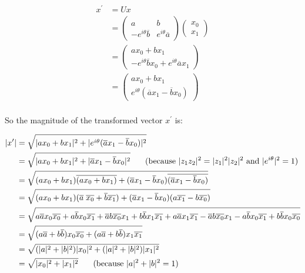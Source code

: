 \documentclass{article}
\begin{document}
\begin{align*}
x^{\prime}
&= U x\\
&= \begin{pmatrix}
   a & b\\
   -e^{i\theta}\overline{b} & e^{i\theta}\overline{a}
\end{pmatrix}
\begin{pmatrix} x_0\\x_1\end{pmatrix}\\
&= \begin{pmatrix}
   ax_0 + bx_1\\
   -e^{i\theta}\overline{b} x_0 +  e^{i\theta}\overline{a} x_1
\end{pmatrix}\\
&= \begin{pmatrix}
   ax_0 + bx_1\\
   e^{i\theta}(
   \overline{a} x_1 - \overline{b} x_0)
\end{pmatrix}\\
\end{align*}

So the magnitude of the transformed vector $x^{\prime}$ is:

\begin{align*}
|x^{\prime}| &=
\sqrt{|ax_0+bx_1|^2 + |e^{i\theta}(\overline{a}x_1-\overline{b}x_0)|^2}\\
&=
\sqrt{|ax_0+bx_1|^2 + |\overline{a}x_1-\overline{b}x_0|^2}
\hspace{0.25in}(\text{because }|z_1 z_2|^2 = |z_1|^2 |z_2|^2 \text{ and } |e^{i\theta}|^2 = 1) \\
&=
\sqrt{(ax_0+bx_1)\overline{(ax_0+bx_1)} + (\overline{a}x_1-\overline{b}x_0)\overline{(\overline{a}x_1-\overline{b}x_0)}}\\
&=
\sqrt{(ax_0+bx_1)(\overline{a}\;\overline{x_0}+\overline{b}\overline{x_1}) + (\overline{a}x_1-\overline{b}x_0)(a\overline{x_1} - b\overline{x_0})}\\
&=
\sqrt{
  a \overline{a} x_0\overline{x_0} +
  a \overline{b} x_0 \overline{x_1} +
  \overline{a} b \overline{x_0} x_1 +
  b \overline{b} x_1 \overline{x_1} +
  a \overline{a} x_1 \overline{x_1} -
  \overline{a} b \overline{x_0} x_1 -
  a \overline{b} x_0 \overline{x_1} +
  b \overline{b} x_0 \overline{x_0}
}\\
&=
\sqrt{
  (a \overline{a} + b \overline{b}) x_0\overline{x_0} +
  (a \overline{a} + b \overline{b}) x_1 \overline{x_1}
}\\
&=
\sqrt{
  (|a|^2 + |b|^2) |x_0|^2 +
  (|a|^2 + |b|^2) |x_1|^2
}\\
&= \sqrt{|x_0|^2 + |x_1|^2}
\hspace{0.25in}(\text{because } |a|^2 + |b|^2 = 1)
\end{align*}
\end{document}
